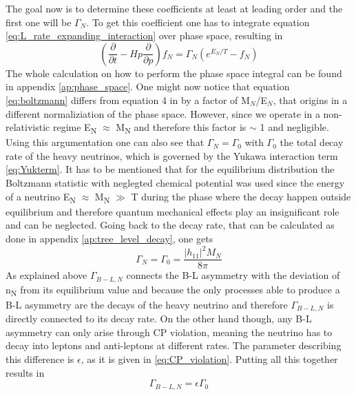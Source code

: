 The goal now is to determine these coefficients at least at leading order and the first one will be $\Gamma_N$. To get this coefficient one has to integrate equation \eqref{eq:L_rate_expanding_interaction} over phase space, resulting in
\begin{equation}
	\left(\frac{\partial}{\partial t}-Hp\frac{\partial}{\partial p}\right)f_N=\Gamma_N\left(e^{E_N/T}-f_N\right)
	\label{eq:boltzmann}
\end{equation}
The whole calculation on how to perform the phase space integral can be found in appendix \ref{ap:phase_space}. \newline
One might now notice that equation \eqref{eq:boltzmann} differs from equation 4 in \cite{Bodeker:2013qaa} by a factor of M$_N$/E$_N$, that origins in a different normaliziation of the phase space. However, since we operate in a non-relativistic regime E\textsubscript{N} $\approx$ M\textsubscript{N} and therefore this factor is $\sim$ 1 and negligible. Using this argumentation one can also see that $\Gamma_N=\Gamma_0$ with $\Gamma_0$ the total decay rate of the heavy neutrinos, which is governed by the Yukawa interaction term \eqref{eq:Yukterm}. It has to be mentioned that for the equilibrium distribution the Boltzmann statistic with neglegted chemical potential was used since the energy of a neutrino E\textsubscript{N} $\approx$ M\textsubscript{N} $\gg$ T during the phase where the decay happen outside equilibrium and therefore quantum mechanical effects play an insignificant role and can be neglected. Going back to the decay rate, that can be calculated as done in appendix \ref{ap:tree_level_decay}, one gets
\begin{equation}
\Gamma_N=\Gamma_0=\frac{|h_{11}|^2M_N}{8\pi}
\label{eq:Gamma_N}
\end{equation}
As explained above $\Gamma_{B-L,N}$ connects the B-L asymmetry with the deviation of n\textsubscript{N} from its equilibrium value and because the only processes able to produce a B-L asymmetry  are the decays of the heavy neutrino and therefore $\Gamma_{B-L,N}$ is directly connected to its decay rate. On the other hand though, any B-L asymmetry can only arise through CP violation, meaning the neutrino has to decay into leptons and anti-leptons at different rates. The parameter describing this difference is $\epsilon$, as it is given in \eqref{eq:CP_violation}. Putting all this together results in 
\begin{equation}
	\Gamma_{B-L,N}=\epsilon\Gamma_0
	\label{eq:Gamma_B-L,N}
\end{equation}
